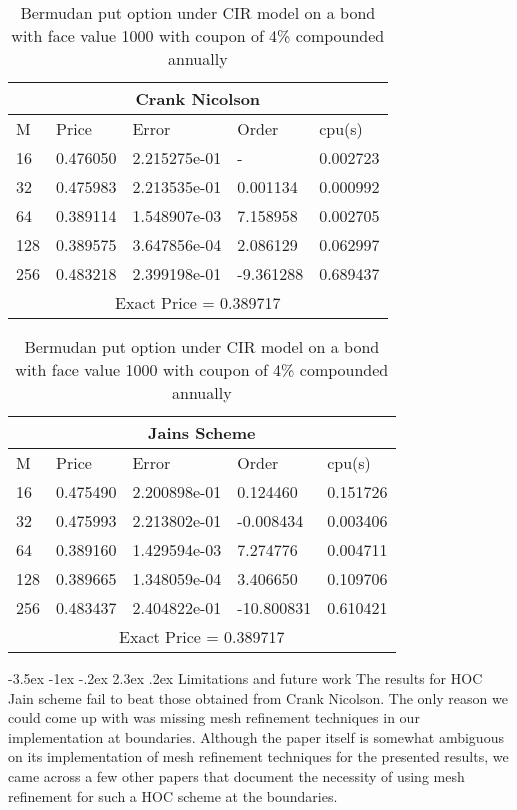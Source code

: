 \documentclass[11pt]{article}
\makeatletter
\renewcommand\section{\@startsection {section}{1}{\z@}%
                                       {-3.5ex \@plus -1ex \@minus -.2ex}%
                                       {2.3ex \@plus.2ex}%
                                       {\normalfont\fontfamily{phv}\fontsize{16}{19}\bfseries}}
\makeatother
\begin{document}
\begin{table}[htp]
\begin{tabular}{ |p{2cm}|p{3cm}|p{3cm}|p{3cm}|p{3cm}|  }

 \hline
 \multicolumn{5}{|c|}{Crank Nicolson} \\
 \hline
 M & Price & Error & Order & cpu(s)\\
 \hline
 16 & 0.476050 & 2.215275e-01 &  - & 0.002723\\
32 & 0.475983 & 2.213535e-01 & 0.001134 & 0.000992\\
64 & 0.389114 & 1.548907e-03 & 7.158958 & 0.002705\\
128 & 0.389575 & 3.647856e-04 & 2.086129 & 0.062997\\
256 & 0.483218 & 2.399198e-01 & -9.361288 & 0.689437\\
 \hline
 \multicolumn{5}{|c|}{Exact Price = 0.389717} \\
 \hline
 
\end{tabular}
\caption{ Bermudan put option under CIR model on a bond with face value 1000 with coupon of 4\% compounded annually}

\end{table}

\begin{table}[htp]
\begin{tabular}{ |p{2cm}|p{3cm}|p{3cm}|p{3cm}|p{3cm}|  }

 \hline
 \multicolumn{5}{|c|}{Jains Scheme} \\
 \hline
 M & Price & Error & Order & cpu(s)\\
 \hline
 16 & 0.475490 & 2.200898e-01 & 0.124460 & 0.151726\\
32 & 0.475993 & 2.213802e-01 & -0.008434 & 0.003406\\
64 & 0.389160 & 1.429594e-03 & 7.274776 & 0.004711\\
128 & 0.389665 & 1.348059e-04 & 3.406650 & 0.109706\\
256 & 0.483437 & 2.404822e-01 & -10.800831 & 0.610421\\
 \hline
 \multicolumn{5}{|c|}{Exact Price = 0.389717} \\
 \hline
 
\end{tabular}
\caption{ Bermudan put option under CIR model on a bond with face value 1000 with coupon of 4\% compounded annually}

\end{table}

\section{Limitations and future work}
The results for HOC Jain scheme fail to beat those obtained from Crank Nicolson. The only reason we could come up with was missing mesh refinement techniques in our implementation at boundaries. Although the paper itself is somewhat ambiguous on its implementation of mesh refinement techniques for the presented results, we came across a few other papers that document the necessity of using mesh refinement for such a HOC scheme at the boundaries.
\end{document}
